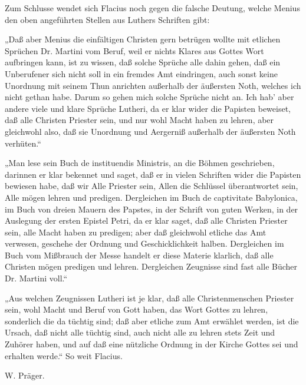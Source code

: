 Zum Schlusse wendet sich Flacius noch gegen die falsche Deutung, welche Menius den oben angeführten Stellen aus
Luthers Schriften gibt:

„Daß aber Menius die einfältigen Christen gern betrügen wollte mit etlichen Sprüchen Dr. Martini vom Beruf,
weil er nichts Klares aus Gottes Wort aufbringen kann, ist zu wissen, daß solche Sprüche alle dahin gehen,
daß ein Unberufener sich nicht soll in ein fremdes Amt eindringen, auch sonst keine Unordnung mit seinem Thun
anrichten außerhalb der äußersten Noth, welches ich nicht gethan habe. Darum so gehen mich solche Sprüche
nicht an. Ich hab’ aber andere viele und klare Sprüche Lutheri, da er klar wider die Papisten beweiset, daß
alle Christen Priester sein, und nur wohl Macht haben zu lehren, aber gleichwohl also, daß sie Unordnung und
Aergerniß außerhalb der äußersten Noth verhüten.“

„Man lese sein Buch de instituendis Ministris, an die Böhmen geschrieben, darinnen er klar bekennet und saget,
daß er in vielen Schriften wider die Papisten bewiesen habe, daß wir Alle Priester sein, Allen die Schlüssel
überantwortet sein, Alle mögen lehren und predigen. Dergleichen im Buch de captivitate Babylonica, im Buch von
dreien Mauern des Papstes, in der
Schrift von guten Werken, in der Auslegung der ersten Epistel Petri, da er klar saget, daß alle Christen
Priester sein, alle Macht haben zu predigen; aber daß gleichwohl etliche das Amt verwesen, geschehe der Ordnung
und Geschicklichkeit halben. Dergleichen im Buch vom Mißbrauch der Messe handelt er diese Materie klarlich,
daß alle Christen mögen predigen und lehren. Dergleichen Zeugnisse sind fast alle Bücher Dr. Martini voll.“

„Aus welchen Zeugnissen Lutheri ist je klar, daß alle Christenmenschen Priester sein, wohl Macht und Beruf
von Gott haben, das Wort Gottes zu lehren, sonderlich die da tüchtig sind; daß aber etliche zum Amt erwählet
werden, ist die Ursach, daß nicht alle tüchtig sind, auch nicht alle zu lehren stets Zeit und Zuhörer haben,
und auf daß eine nützliche Ordnung in der Kirche Gottes sei und erhalten werde.“ So weit Flacius.

\begin{unterschrift}
W. Präger.
\end{unterschrift}

